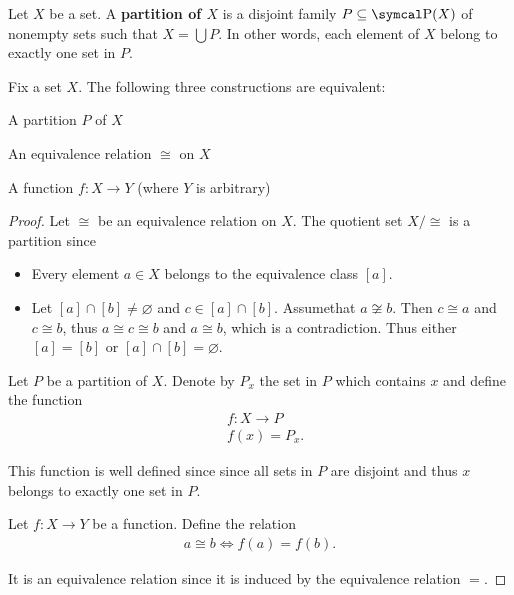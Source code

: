 \begin{definition}\label{def:set_partition}
  Let \( X \) be a set. A \textbf{partition of \( X \)} is a disjoint family \( P \subseteq \Power(X) \) of nonempty sets such that \( X = \bigcup P \). In other words, each element of \( X \) belong to exactly one set in \( P \).
\end{definition}

\begin{proposition}\label{thm:equivalence_partition}
  Fix a set \( X \). The following three constructions are equivalent:
  \begin{defenum}
    \item\label{thm:equivalence_partition/partition} A partition \( P \) of \( X \)
    \item\label{thm:equivalence_partition/equivalence} An equivalence relation \( \cong \) on \( X \)
    \item\label{thm:equivalence_partition/function} A function \( f: X \to Y \) (where \( Y \) is arbitrary)
  \end{defenum}
\end{proposition}
\begin{proof}
   Let \( \cong \) be an equivalence relation on \( X \). The quotient set \( X / \cong \) is a partition since
  \begin{itemize}
    \item Every element \( a \in X \) belongs to the equivalence class \( [a] \).
    \item Let \( [a] \cap [b] \neq \varnothing \) and \( c \in [a] \cap [b] \). Assume\LEM that \( a \not\cong b \). Then \( c \cong a \) and \( c \cong b \), thus \( a \cong c \cong b \) and \( a \cong b \), which is a contradiction. Thus either \( [a] = [b] \) or \( [a] \cap [b] = \varnothing \).
  \end{itemize}

   Let \( P \) be a partition of \( X \). Denote by \( P_x \) the set in \( P \) which contains \( x \) and define the function
  \begin{align*}
    &f: X \to P \\
    &f(x) = P_x.
  \end{align*}

  This function is well defined since since all sets in \( P \) are disjoint and thus \( x \) belongs to exactly one set in \( P \).

   Let \( f: X \to Y \) be a function. Define the relation
  \begin{align*}
    a \cong b \iff f(a) = f(b).
  \end{align*}

  It is an equivalence relation since it is induced by the equivalence relation \( = \).
\end{proof}


